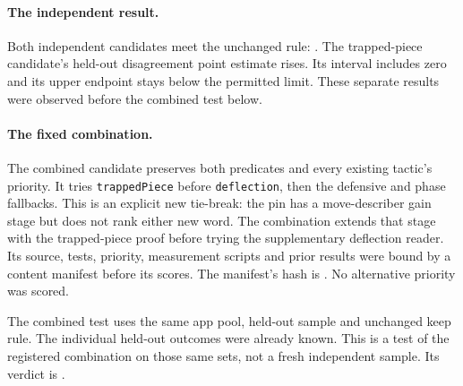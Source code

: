 \documentclass[11pt]{article}
\begin{document}
\begin{table}[htbp]
\centering
\small
\RTwoCounts
\caption{Puzzles on which the best-move labeller agrees or disagrees with a
tag. Each reader scores the complete app pool and held-out sample.}
\end{table}

\begin{table}[htbp]
\centering
\small
\RTwoTable
\caption{Candidate-minus-pinned changes in percentage points, with
\RTwoConfidence\% paired bootstrap intervals. Each candidate is tested
independently against the pin. The last column applies the fixed rule to that
set; keeping a candidate requires passing both sets.}
\end{table}

\paragraph{The independent result.} Both independent candidates meet the unchanged rule:
\RTwoVerdicts. The trapped-piece candidate's held-out disagreement point
estimate rises. Its interval includes zero and its upper endpoint stays below
the permitted limit. These separate results were observed before the combined
test below.

\paragraph{The fixed combination.} The combined candidate preserves both
predicates and every existing tactic's priority. It tries \texttt{trappedPiece}
before \texttt{deflection}, then the defensive and phase fallbacks. This is an
explicit new tie-break: the pin has a move-describer gain stage but does not
rank either new word. The combination extends that stage with the trapped-piece
proof before trying the supplementary deflection reader. Its source, tests,
priority, measurement scripts and prior results were bound by a content
manifest before its scores. The manifest's hash is
\texttt{\RTwoCombinedManifestHash}. No alternative priority was scored.

The combined test uses the same app pool, held-out sample and unchanged keep
rule. The individual held-out outcomes were already known. This is a test of
the registered combination on those same sets, not a fresh independent sample.
Its verdict is \textbf{\RTwoCombinedVerdict}. \RTwoCombinedMeaning

\begin{table}[htbp]
\centering
\small
\RTwoCombinedCounts
\caption{Combined best-move labeller: puzzles agreeing or disagreeing with a
tag. The baseline counts appear in the independent results above.}
\end{table}
\end{document}
